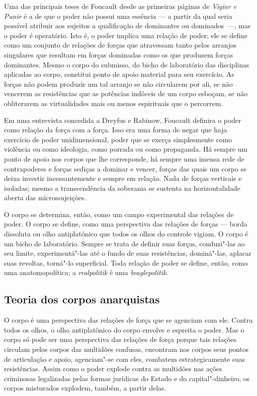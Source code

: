 Uma das principais teses de Foucault desde as primeiras páginas de
\emph{Vigiar e Punir} é a de que o poder não possui uma essência --- a
partir da qual seria possível atribuir aos sujeitos a qualificação de
dominantes ou dominados~---, mas o poder é operatório. Isto é, o poder
implica uma relação de poder; ele se define como um conjunto de relações
de forças que atravessam tanto pelos arranjos singulares que resultam em
forças dominadas como os que produzem forças dominantes. Mesmo o corpo
do submisso, do bicho de laboratório das disciplinas aplicadas ao corpo,
constitui ponto de apoio material para seu exercício. As forças não
podem produzir um tal arranjo se não circularem por ali, se não vencerem
as resistências que as potências indóceis de um corpo esboçam, se não
obliterarem as virtualidades mais ou menos espirituais que o percorrem.

Em uma entrevista concedida a Dreyfus e Rabinow, Foucault definira o
poder como relação da força com a força. Isso era uma forma de negar que
haja exercício de poder unidimensional, poder que se exerça simplesmente
como violência ou como ideologia, como porrada ou como propaganda. Há
sempre um ponto de apoio nos corpos que lhe corresponde, há sempre uma
imensa rede de contrapoderes e forças sediças a dominar e vencer, forças
das quais um corpo se deixa investir incessantemente e sempre em
relação. Nada de forças verticais e isoladas; mesmo a transcendência da
soberania se sustenta na horizontalidade aberta das microssujeições.

O corpo se determina, então, como um campo experimental das relações de
poder. O corpo se define, como uma perspectiva das relações de forças ---
borda dissoluta ou olho antiplatônico que todos os olhos do controle
vigiam. O corpo é um bicho de laboratório. Sempre se trata de definir
suas forças, conduzi"-las ao seu limite, experimentá"-las até o fundo de
suas resistências, dominá"-las, aplacar suas revoltas, torná"-lo
superficial. Toda relação de poder se define, então, como uma
anatomopolítica; a \emph{realpolitik }é uma \emph{beaglepolitik}.

\subsection{Teoria dos corpos anarquistas}

O corpo é uma perspectiva das
relações de força que se agenciam com ele. Contra todos os olhos, o olho
antiplatônico do corpo envolve e espreita o poder. Mas o corpo só pode
ser uma perspectiva das relações de força porque tais relações circulam
pelos corpos das multidões confusas, encontram nos corpos seus pontos de
articulação e apoio, agenciam"-se com eles, combatem estrategicamente
suas resistências. Assim como o poder explode contra as multidões nas
ações criminosas legalizadas pelas formas jurídicas do Estado e do
capital"-dinheiro, os corpos misturados explodem, também, a partir delas.

